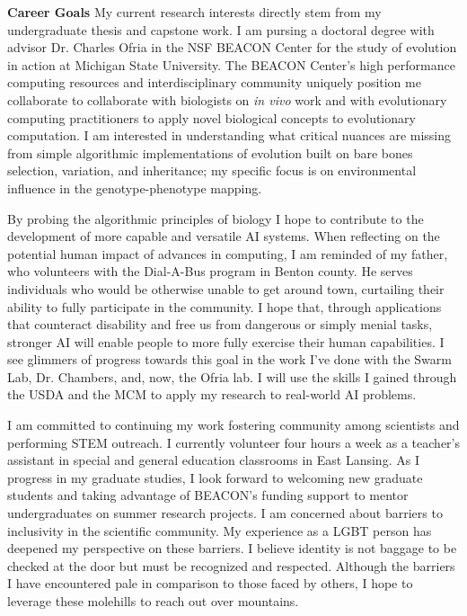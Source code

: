\textbf{Career Goals}
My current research interests directly stem from my undergraduate thesis and capstone work.
I am pursing a doctoral degree with advisor Dr. Charles Ofria in the NSF BEACON Center for the study of evolution in action at Michigan State University.
The BEACON Center's high performance computing resources and interdisciplinary community uniquely position me collaborate to collaborate with biologists on \textit{in vivo} work and with evolutionary computing practitioners to apply novel biological concepts to evolutionary computation.
I am interested in understanding what critical nuances are missing from simple algorithmic implementations of evolution built on bare bones selection, variation, and inheritance;
my specific focus is on environmental influence in the genotype-phenotype mapping.

By probing the algorithmic principles of biology I hope to contribute to the development of more capable and versatile AI systems.
When reflecting on the potential human impact of advances in computing, I am reminded of my father, who volunteers with the Dial-A-Bus program in Benton county.
He serves individuals who would be otherwise unable to get around town, curtailing their ability to fully participate in the community.
I hope that, through applications that counteract disability and free us from dangerous or simply menial tasks, stronger AI will enable people to more fully exercise their human capabilities.
I see glimmers of progress towards this goal in the work I've done with the Swarm Lab, Dr. Chambers, and, now, the Ofria lab.
I will use the skills I gained through the USDA and the MCM to apply my research to real-world AI problems.

I am committed to continuing my work fostering community among scientists and performing STEM outreach.
I currently volunteer four hours a week as a teacher's assistant in special and general education classrooms in East Lansing.
As I progress in my graduate studies, I look forward to welcoming new graduate students and taking advantage of BEACON's funding support to mentor undergraduates on summer research projects.
I am concerned about barriers to inclusivity in the scientific community.
My experience as a LGBT person has deepened my perspective on these barriers.
I believe identity is not baggage to be checked at the door but must be recognized and respected.
Although the barriers I have encountered pale in comparison to those faced by others, I hope to leverage these molehills to reach out over mountains.
